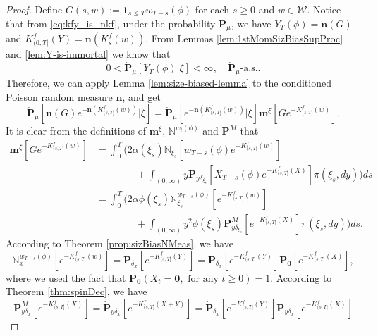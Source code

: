 \begin{proof}
	Define $G(s,w) := \mathbf 1_{s\leq T}w_{T-s}(\phi)$ for each $s\geq 0$ and $w\in\mathcal W$.
	Notice that from \eqref{eq:kfy_is_nkf}, under the probability $\dot {\mathbf P}_\mu$,
	we have $Y_T(\phi) = \mathbf n(G)$ and
	$K_{(0, T]}^f(Y) = \mathbf n(K^f_{s}(w))$.
	From Lemmas \ref{lem:1stMomSizBiasSupProc} and \ref{lem:Y-is-immortal} we know that
\[
	0
	< \dot{\mathbf P}_{\mu}[Y_T(\phi)|\xi]
	< \infty,
	\quad \dot{\mathbf P}_\mu \text{-a.s.}.
\]
	Therefore, we can apply Lemma \ref{lem:size-biased-lemma} to the conditioned
	Poisson random measure $\mathbf n$, and get
\begin{equation}\label{eq:condSizBiasEquatSpinImmigr}
    \dot{\mathbf P}_\mu [\mathbf n(G) e^{-\mathbf n(K^f_{(s, T]}(w))}|\xi]
	=\dot{\mathbf P}_\mu[e^{-\mathbf n(K^f_{(s, T]}(w))}|\xi]\mathbf m^\xi[Ge^{-K^f_{(s, T]}(w)}].
\end{equation}
	It is clear from the definitions of $\mathbf m^\xi$, $\mathbb N^{w_t(\phi)}$ and $\mathbf P^M$ that
\begin{equation}\label{eq:represent-mGeKf}\begin{split}
    \mathbf m^\xi[Ge^{-K_{(s, T]}^f(w)}]
	&=\int_0^T \Big( 2\alpha(\xi_s)\mathbb N_{\xi_s}[w_{T-s}(\phi)e^{-K^f_{(s,T]}(w)}]\\
	&\qquad\qquad +\int_{(0,\infty)}y\mathbf P_{y\delta_{\xi_s}}[X_{T-s}(\phi)e^{-K^f_{(s,T]}(X)}]\pi(\xi_s,dy)\Big)ds\\
	&=\int_0^T \Big(2\alpha\phi(\xi_s)\mathbb N^{w_{T-s}(\phi)}_{\xi_s}[e^{-K^f_{(s,T]}(w)}] \\
	&\qquad\qquad + \int_{(0,\infty)}y^2\phi(\xi_s)\mathbf P^M_{y\delta_{\xi_s}}[e^{-K^f_{(s,T]}(X)}]\pi(\xi_s,dy)\Big)ds.
\end{split}\end{equation}
	According to  Theorem \ref{prop:sizBiasNMeas}, we have
\begin{equation}
\label{eq:represent-NxwTsphi}
	\mathbb N_x^{w_{T-s}(\phi)}[e^{-K^f_{(s,T]}(w)}]
	= \dot{\mathbf P}_{\delta_x}[e^{-K^f_{(s,T]}(Y)}]
	= \dot{\mathbf P}_{\delta_x}[e^{-K^f_{(s,T]}(Y)}]\mathbf P_{\mathbf 0}[e^{-K^f_{(s,T]}(X)}],
\end{equation}
	where we used the fact that $\mathbf P_{\mathbf 0}(X_t=\mathbf 0,\mbox{ for any }t\ge 0)=1$.
	According to Theorem \ref{thm:spinDec}, we have
\begin{equation}\label{eq:represent-PMydeltax}
	\mathbf P^M_{y\delta_x}[e^{-K^f_{(s,T]}(X)}]
	= \dot{\mathbf P}_{y\delta_x}[e^{-K^f_{(s,T]}(X+Y)}]
	=\dot{\mathbf P}_{\delta_x}[e^{-K^f_{(s,T]}(Y)}]\mathbf P_{y\delta_x}[e^{-K^f_{(s,T]}(X)}]

\end{equation}
\end{proof}
